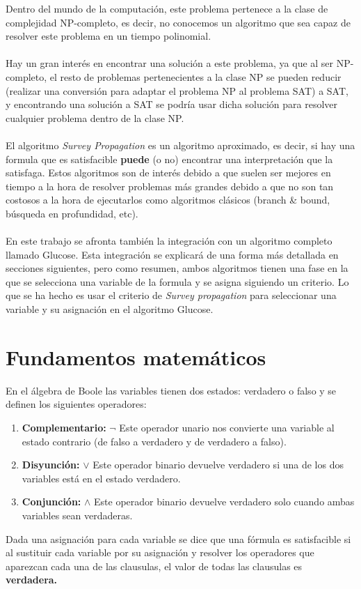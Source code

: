 Dentro del mundo de la computación, este problema pertenece a la clase de complejidad NP-completo, es decir, no conocemos un algoritmo que sea capaz de resolver este problema en un tiempo polinomial.\\\\
Hay un gran interés en encontrar una solución a este problema, ya que al ser NP-completo, el resto de problemas pertenecientes a la clase NP se pueden reducir (realizar una conversión para adaptar el problema NP al problema SAT) a SAT, y encontrando una solución a SAT se podría usar dicha solución para resolver cualquier problema dentro de la clase NP.\\\\
El algoritmo \textit{Survey Propagation} es un algoritmo aproximado, es decir, si hay una formula que es satisfacible \textbf{puede} (o no) encontrar una interpretación que la satisfaga.
Estos algoritmos son de interés debido a que suelen ser mejores en tiempo a la hora de resolver problemas más grandes debido a que no son tan costosos a la hora de ejecutarlos como algoritmos clásicos (branch \& bound, búsqueda en profundidad, etc).\\\\
En este trabajo se afronta también la integración con un algoritmo completo llamado Glucose. Esta integración se explicará de una forma más detallada en secciones siguientes, pero como resumen, ambos algoritmos tienen una fase en la que se selecciona una variable de la formula y se asigna siguiendo un criterio. Lo que se ha hecho es usar el criterio de \textit{Survey propagation} para seleccionar una variable y su asignación en el algoritmo Glucose.
\pagebreak
\section{Fundamentos matemáticos}
En el álgebra de Boole las variables tienen dos estados: verdadero o falso y se definen los siguientes operadores:
\begin{enumerate}[1.]
	\item \textbf{Complementario:} $\neg$ Este operador unario nos convierte una variable al estado contrario (de falso a verdadero y de verdadero a falso).
	\item \textbf{Disyunción:} $\lor$ Este operador binario devuelve verdadero si una de los dos variables está en el estado verdadero.
	\item \textbf{Conjunción:} $\land$ Este operador binario devuelve verdadero solo cuando ambas variables sean verdaderas.
\end{enumerate}
Dada una asignación para cada variable se dice que una fórmula es satisfacible si al sustituir cada variable por su asignación y resolver los operadores que aparezcan cada una de las clausulas, el valor de todas las clausulas es \textbf{verdadera.} 
